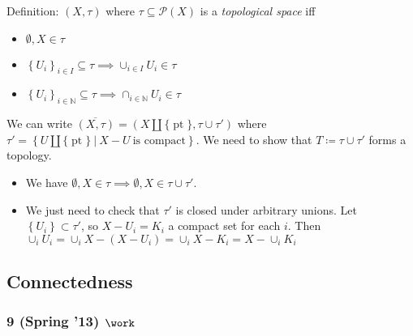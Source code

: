 \begin{solution}

\envlist

\begin{concept}

\envlist

Definition: \((X, \tau)\) where \(\tau \subseteq \mathcal P(X)\) is a
\emph{topological space} iff

\begin{itemize}
\tightlist
\item
  \(\emptyset, X \in \tau\)
\item
  \(\left\{{U_i}\right\}_{i\in I} \subseteq \tau \implies \cup_{i\in I} U_i \in \tau\)
\item
  \(\left\{{U_i}\right\}_{i\in {\mathbb{N}}} \subseteq \tau \implies \cap_{i\in {\mathbb{N}}} U_i \in \tau\)
\end{itemize}

\end{concept}

We can write
\(\overline{(X, \tau)} = (X {\coprod}{\{\operatorname{pt}\}}, \tau \cup\tau')\)
where
\(\tau' = \left\{{U{\coprod}{\{\operatorname{pt}\}}{~\mathrel{\Big|}~}X-U ~\text{is compact}}\right\}\).
We need to show that \(T \coloneqq\tau \cup\tau'\) forms a topology.

\begin{itemize}
\tightlist
\item
  We have
  \(\emptyset,X \in \tau \implies \emptyset, X \in \tau \cup\tau'\).
\item
  We just need to check that \(\tau'\) is closed under arbitrary unions.
  Let \(\left\{{U_i}\right\} \subset \tau'\), so \(X-U_i = K_i\) a
  compact set for each \(i\). Then
  \(\cup_{i} U_i = \cup_i X- (X-U_i)= \cup_i X - K_i = X - \cup_i K_i\)
\end{itemize}

\end{solution}

\hypertarget{connectedness}{%
\subsection{Connectedness}\label{connectedness}}

\hypertarget{spring-13-work}{%
\subsubsection{\texorpdfstring{9 (Spring '13)
\(\work\)}{9 (Spring '13) \textbackslash work}}\label{spring-13-work}}

